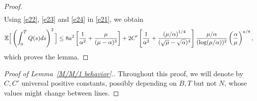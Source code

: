 \documentclass[11pt, reqno]{article}
\numberwithin{equation}{section}
\numberwithin{theorem}{section}
\begin{document}
\begin{appendix}
\begin{proof}
\begin{align}
\end{align}
Using \eqref{e22}, \eqref{e23} and \eqref{e24} in \eqref{e21}, we obtain
$$
\mathbb{E}\Big[\left(\int_0^{\Tilde{T}}Q(s)ds\right)^2\Big] \le 8a^2\left[\frac{1}{\alpha^2} + \frac{\mu}{(\mu - \alpha)^3}\right] + 2C'\left[\frac{1}{\alpha^2} + \frac{\left(\mu/\alpha\right)^{1/4}}{(\sqrt{\mu} - \sqrt{\alpha})^4}\right]\frac{\mu/\alpha}{(\log(\mu/\alpha))^2} \left(\frac{\alpha}{\mu}\right)^{a/8},
$$
which proves the lemma.
\end{proof}



\begin{proof}[Proof of Lemma~\ref{M/M/1 behavior}.]
Throughout this proof, we will denote by $C,C'$ universal positive constants, possibly depending on $B,T$ but not $N$, whose values might change between lines.


\end{proof}
\end{appendix}
\end{document}
